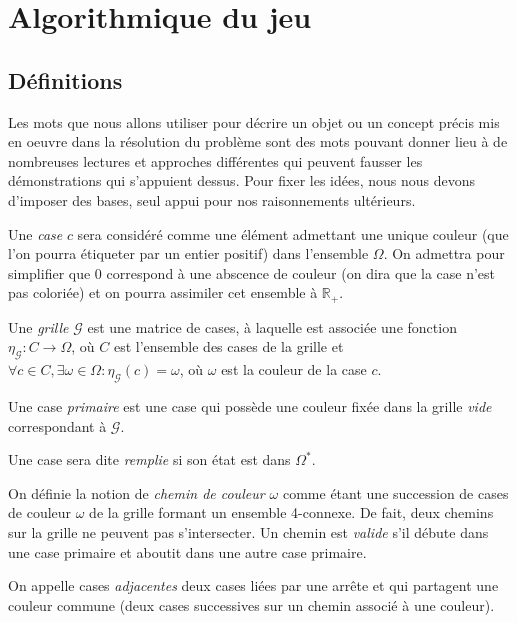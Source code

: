 \chapter{Algorithmique du jeu}

\section{Définitions}
Les mots que nous allons utiliser pour décrire un objet ou un concept précis mis en oeuvre dans la résolution du problème sont des mots pouvant donner lieu à de nombreuses lectures et approches différentes qui peuvent fausser les démonstrations qui s'appuient dessus. Pour fixer les idées, nous nous devons d'imposer des bases, seul appui pour nos raisonnements ultérieurs.

\label{sect:def}
Une \textit{case} $c$ sera considéré comme une élément admettant une unique couleur (que l'on pourra étiqueter par un entier positif) dans l'ensemble $\Omega$. On admettra pour simplifier que 0 correspond à une abscence de couleur (on dira que la case n'est pas coloriée) et on pourra assimiler cet ensemble à $\mathbb{R}_+$.

Une \textit{grille} $\mathcal{G}$ est une matrice de cases, à laquelle est associée une fonction $\eta_\mathcal{G} : C\rightarrow \Omega$, où $C$ est l'ensemble des cases de la grille et $\forall c\in C, \exists \omega\in \Omega : \eta_\mathcal{G}(c) = \omega$, où $\omega$ est la couleur de la case $c$.

Une case \textit{primaire} est une case qui possède une couleur fixée dans la grille \textit{vide} correspondant à $\mathcal{G}$.

Une case sera dite \textit{remplie} si son état est dans $\Omega^*$.

On définie la notion de \textit{chemin de couleur $\omega$} comme étant une succession de cases de couleur $\omega$ de la grille formant un ensemble 4-connexe. De fait, deux chemins sur la grille ne peuvent pas s'intersecter. Un chemin est \textit{valide} s'il débute dans une case primaire et aboutit dans une autre case primaire.

On appelle cases \textit{adjacentes} deux cases liées par une arrête et qui partagent une couleur commune (deux cases successives sur un chemin associé à une couleur).

